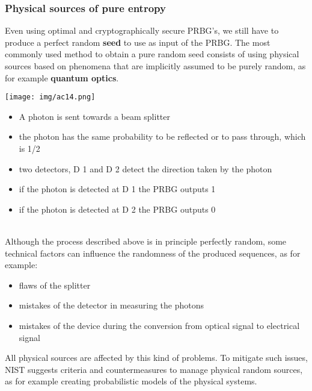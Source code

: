 \documentclass[a4paper, 10pt, titlepage]{article}
\begin{document}
\subsubsection*{Physical sources of pure entropy}
Even using optimal and cryptographically secure PRBG’s, we still have to produce a perfect random \textbf{seed} to use as input of the PRBG.
The most commonly used method to obtain a pure random seed consists of using physical sources based on phenomena that are implicitly assumed to be purely random, as for example \textbf{quantum optics}. \medskip \\
\begin{minipage}{0.3\textwidth}
\texttt{[image: img/ac14.png]}
\end{minipage}
\begin{minipage}{0.6\textwidth}
\begin{itemize}
\item A photon is sent towards a beam splitter
\item the photon has the same probability to be reflected or to pass through, which is 1/2
\item two detectors, D 1 and D 2 detect the direction taken by the photon 
\item if the photon is detected at D 1 the PRBG outputs 1
\item if the photon is detected at D 2 the PRBG outputs 0
\end{itemize}
\end{minipage} \medskip \\
Although the process described above is in principle perfectly random, some technical factors can influence the randomness of the produced sequences, as for example:
\begin{itemize}
\item flaws of the splitter
\item mistakes of the detector in measuring the photons
\item mistakes of the device during the conversion from optical signal to electrical signal
\end{itemize}
All physical sources are affected by this kind of problems. To mitigate such issues, NIST suggests criteria and countermeasures to manage physical random sources, as for example creating probabilistic models of the physical systems.
\end{document}
